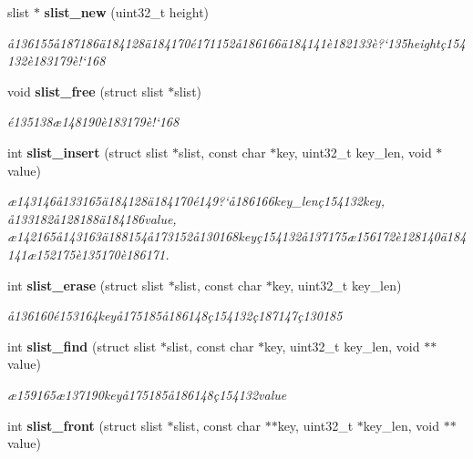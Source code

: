 \begin{CompactItemize}
\item 
slist $\ast$ {\bf slist\_\-new} (uint32\_\-t height)
\begin{CompactList}\small\item\em \aa{}136155\aa{}187186\"{a}184128\"{a}184170\'{e}171152\aa{}186166\"{a}184141\`{e}182133\`{e}?`135height\c{c}154132\`{e}183179\`{e}!`168 \item\end{CompactList}\item 
void {\bf slist\_\-free} (struct slist $\ast$slist)
\begin{CompactList}\small\item\em \'{e}135138\ae{}148190\`{e}183179\`{e}!`168 \item\end{CompactList}\item 
int {\bf slist\_\-insert} (struct slist $\ast$slist, const char $\ast$key, uint32\_\-t key\_\-len, void $\ast$value)
\begin{CompactList}\small\item\em \ae{}143146\aa{}133165\"{a}184128\"{a}184170\'{e}149?`\aa{}186166key\_\-len\c{c}154132key, \aa{}133182\aa{}128188\"{a}184186value, \ae{}142165\aa{}143163\"{a}188154\aa{}173152\aa{}130168key\c{c}154132\aa{}137175\ae{}156172\`{e}128140\"{a}184141\ae{}152175\`{e}135170\`{e}186171. \item\end{CompactList}\item 
int {\bf slist\_\-erase} (struct slist $\ast$slist, const char $\ast$key, uint32\_\-t key\_\-len)
\begin{CompactList}\small\item\em \aa{}136160\'{e}153164key\aa{}175185\aa{}186148\c{c}154132\c{c}187147\c{c}130185 \item\end{CompactList}\item 
int {\bf slist\_\-find} (struct slist $\ast$slist, const char $\ast$key, uint32\_\-t key\_\-len, void $\ast$$\ast$value)
\begin{CompactList}\small\item\em \ae{}159165\ae{}137190key\aa{}175185\aa{}186148\c{c}154132value \item\end{CompactList}\item 
int {\bf slist\_\-front} (struct slist $\ast$slist, const char $\ast$$\ast$key, uint32\_\-t $\ast$key\_\-len, void $\ast$$\ast$value)
$$
\end{CompactItemize}
